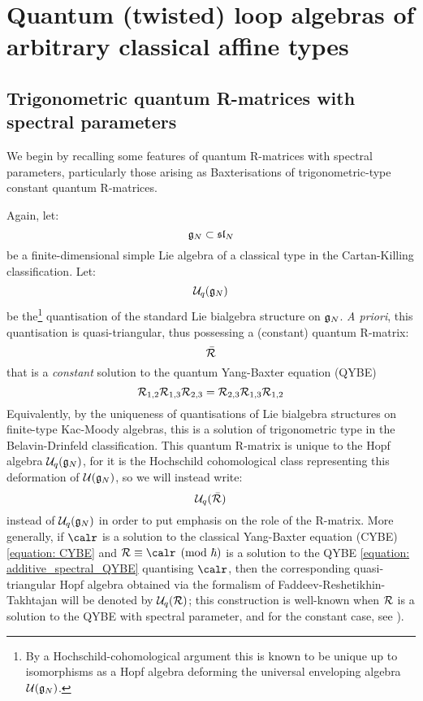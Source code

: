 \section{Quantum (twisted) loop algebras of arbitrary classical affine types}
    \subsection{Trigonometric quantum R-matrices with spectral parameters}
        We begin by recalling some features of quantum R-matrices with spectral parameters, particularly those arising as Baxterisations of trigonometric-type constant quantum R-matrices. 
    
        Again, let:
            $$\mathfrak{g}_N \subset \mathfrak{sl}_N$$
        be a finite-dimensional simple Lie algebra of a classical type in the Cartan-Killing classification. Let:
            $$\mathcal{U}_q(\mathfrak{g}_N)$$
        be the\footnote{By a Hochschild-cohomological argument this is known to be unique up to isomorphisms as a Hopf algebra deforming the universal enveloping algebra $\mathcal{U}(\mathfrak{g}_N)$.} quantisation of the standard Lie bialgebra structure on $\mathfrak{g}_N$. \textit{A priori}, this quantisation is quasi-triangular, thus possessing a (constant) quantum R-matrix:
            $$\bar{\mathcal{R}}$$
        that is a \textit{constant} solution to the quantum Yang-Baxter equation (QYBE)
            \begin{equation} \label{equation: constant_QYBE}
                \mathcal{R}_{1, 2} \mathcal{R}_{1, 3} \mathcal{R}_{2, 3} = \mathcal{R}_{2, 3} \mathcal{R}_{1, 3} \mathcal{R}_{1, 2}
            \end{equation}
        Equivalently, by the uniqueness of quantisations of Lie bialgebra structures on finite-type Kac-Moody algebras, this is a solution of trigonometric type in the Belavin-Drinfeld classification. This quantum R-matrix is unique to the Hopf algebra $\mathcal{U}_q(\mathfrak{g}_N)$, for it is the Hochschild cohomological class representing this deformation of $\mathcal{U}(\mathfrak{g}_N)$, so we will instead write:
            $$\mathcal{U}_q(\bar{\mathcal{R}})$$
        instead of $\mathcal{U}_q(\mathfrak{g}_N)$ in order to put emphasis on the role of the R-matrix. More generally, if $\calr$ is a solution to the classical Yang-Baxter equation (CYBE) \eqref{equation: CYBE} and $\calR \equiv \calr \pmod{\hbar}$ is a solution to the QYBE \eqref{equation: additive_spectral_QYBE} quantising $\calr$, then the corresponding quasi-triangular Hopf algebra obtained via the formalism of Faddeev-Reshetikhin-Takhtajan will be denoted by $\mathcal{U}_q(\mathcal{R})$; this construction is well-known when $\mathcal{R}$ is a solution to the QYBE with spectral parameter, and for the constant case, see \cite{gautam_rupert_wendlandt_R_matrix_presentation_for_finite_QUEs}).
    
